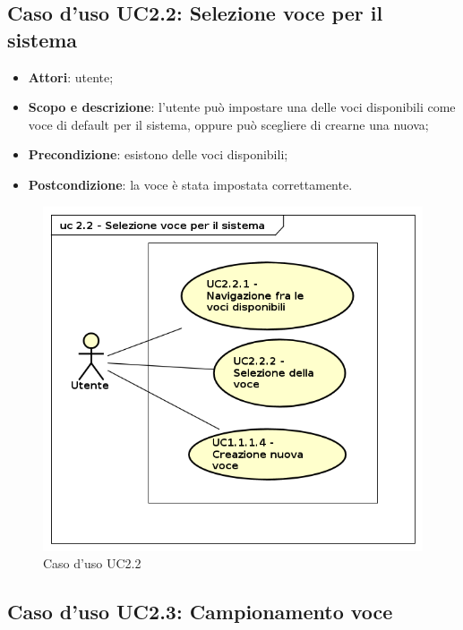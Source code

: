 \subsection{Caso d'uso UC2.2: Selezione voce per il sistema}
\label{sec:UC2.2}

\begin{itemize}
\item \textbf{Attori}: utente;
\item \textbf{Scopo e descrizione}: l'utente può impostare una delle voci disponibili come voce di default per il sistema, oppure può scegliere di crearne una nuova;
\item \textbf{Precondizione}: esistono delle voci disponibili;
\item \textbf{Postcondizione}: la voce è stata impostata correttamente.
\end{itemize}
\begin{figure}[htbp]
\centering
\includegraphics[scale=0.5]{immagini/uc2_2_selezione_voce_sistema.png}
\captionsetup{labelfont=bf}
\caption{Caso d'uso UC2.2}
\end{figure}
\newpage

\subsection{Caso d'uso UC2.3: Campionamento voce}
\label{sec:UC2.3}

